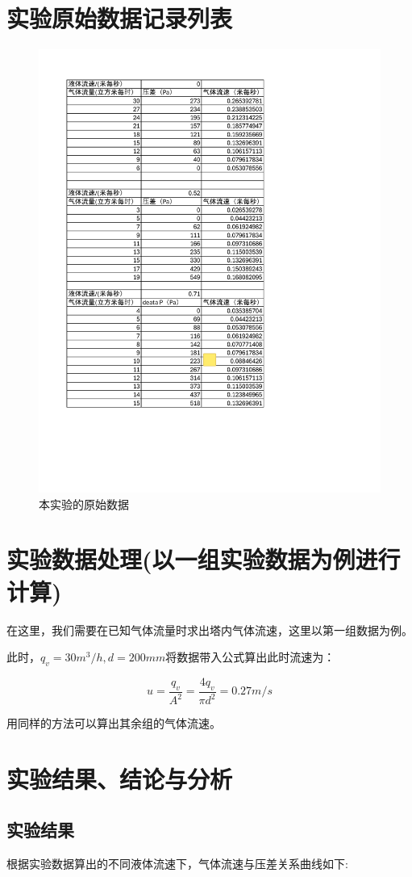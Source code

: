 \documentclass[a4paper,UTF8]{ctexrep}
\theoremstyle{plain}
\theoremstyle{definition}
\numberwithin{equation}{chapter}
\begin{document}
        \section{实验原始数据记录列表}
\begin{figure}[h]
    \centering
    \includegraphics[width=0.8\linewidth]{Book1.pdf}
    \caption{本实验的原始数据}
    \label{fig:enter-lajsbel}
\end{figure}


        \section{实验数据处理(以一组实验数据为例进行计算)}
        在这里，我们需要在已知气体流量时求出塔内气体流速，这里以第一组数据为例。

        此时，$q_v=30m^3/h, d=200mm$将数据带入公式算出此时流速为：

        $$ u =\frac{q_v}{A^2}=\frac{4q_v}{\pi d^2}=0.27m/s$$


        用同样的方法可以算出其余组的气体流速。
        
        \section{实验结果、结论与分析}
\subsection{实验结果}
根据实验数据算出的不同液体流速下，气体流速与压差关系曲线如下:
\end{document}
